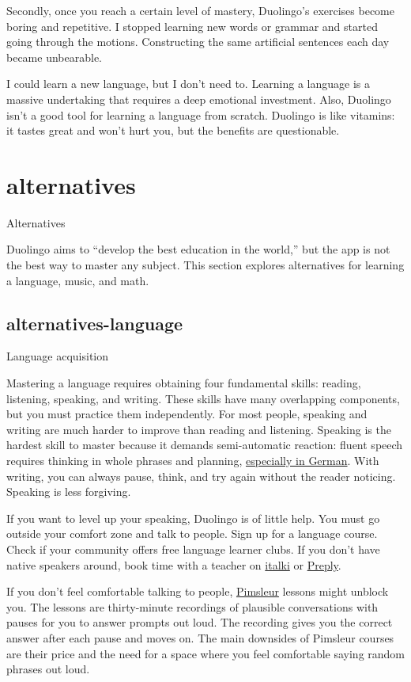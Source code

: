 \documentclass{article}
\begin{document}
Secondly, once you reach a certain level of mastery, Duolingo's exercises become boring and repetitive.
I stopped learning new words or grammar and started going through the motions.
Constructing the same artificial sentences each day became unbearable.

I could learn a new language, but I don't need to.
Learning a language is a massive undertaking that requires a deep emotional investment.
Also, Duolingo isn't a good tool for learning a language from scratch.
Duolingo is like vitamins: it tastes great and won't hurt you,
but the benefits are questionable.

\section{alternatives}{Alternatives}

Duolingo aims to ``develop the best education in the world,''
but the app is not the best way to master any subject.
This section explores alternatives for learning a language, music, and math.

\subsection{alternatives-language}{Language acquisition}

Mastering a language requires obtaining four fundamental skills: reading, listening, speaking, and writing.
These skills have many overlapping components, but you must practice them independently.
For most people, speaking and writing are much harder to improve than reading and listening.
Speaking is the hardest skill to master because it demands semi-automatic reaction:
fluent speech requires thinking in whole phrases and planning, \href{https://en.wikipedia.org/wiki/The_Awful_German_Language}{especially in German}.
With writing, you can always pause, think, and try again without the reader noticing.
Speaking is less forgiving.

If you want to level up your speaking, Duolingo is of little help.
You must go outside your comfort zone and talk to people.
Sign up for a language course.
Check if your community offers free language learner clubs.
If you don't have native speakers around, book time with a teacher on \href{https://www.italki.com}{italki} or \href{https://preply.com}{Preply}.

If you don't feel comfortable talking to people, \href{https://www.pimsleur.com/}{Pimsleur} lessons might unblock you.
The lessons are thirty-minute recordings of plausible conversations with pauses for you to answer prompts out loud.
The recording gives you the correct answer after each pause and moves on.
The main downsides of Pimsleur courses are their price and the need for a space where you feel comfortable saying random phrases out loud.
\end{document}
